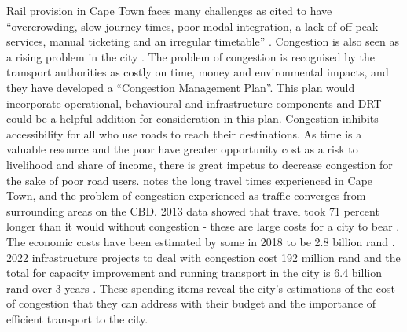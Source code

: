\documentclass[a4paper]{article}
\begin{document}
Rail provision in Cape Town faces many challenges as cited to have “overcrowding, slow journey times, poor modal integration, a lack of off-peak services, manual ticketing and an irregular timetable” \citep{TDCIP}. Congestion is also seen as a rising problem in the city \citep{TDCIP}. The problem of congestion is recognised by the transport authorities as costly on time, money and environmental impacts, and they have developed a “Congestion Management Plan”. This plan would incorporate operational, behavioural and infrastructure components and DRT could be a helpful addition for consideration in this plan.
Congestion inhibits accessibility for all who use roads to reach their destinations. As time is a valuable resource and the poor have greater opportunity cost as a risk to livelihood and share of income, there is great impetus to decrease congestion for the sake of poor road users. \citealp{jennings2015finding} notes the long travel times experienced in Cape Town, and the problem of congestion experienced as traffic converges from surrounding areas on the CBD. 2013 data showed that travel took 71 percent longer than it would without congestion - these are large costs for a city to bear \citep{TDA}. The economic costs have been estimated by some in 2018 to be 2.8 billion rand \citep{IOL}. 2022 infrastructure projects to deal with congestion cost 192 million rand and the total for capacity improvement and running transport in the city is 6.4 billion rand over 3 years \citep{TCT}. These spending items reveal the city's estimations of the cost of congestion that they can address with their budget and the importance of efficient transport to the city.\\
\end{document}
